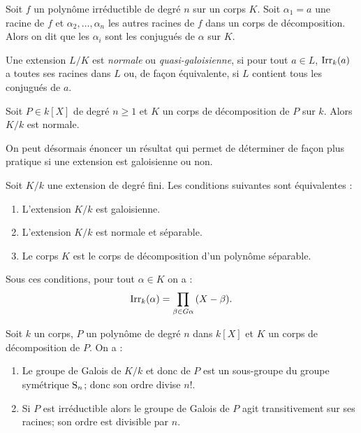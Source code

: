 \documentclass[a4paper]{article} %
\numberwithin{section}{part}
\numberwithin{equation}{section}
\newcommand\Irr[2]{\textup{Irr}_{#1}(#2)}
\begin{document}
Soit $f$ un polynôme irréductible de degré $n$ sur un corps $K$. Soit $\alpha_1 
= a$ une racine de $f$ et $\alpha_2,\dots,\alpha_n$ les autres racines de $f$ 
dans un corps de décomposition. Alors on dit que les $\alpha_i$ sont les 
conjugués de $\alpha$ sur $K$.
\begin{defn}
Une extension $L/K$ est \emph{normale} ou \emph{quasi-galoisienne}, si pour tout
$a\in L$, $\Irr{k}{a}$ a toutes ses racines dans $L$ ou, de façon équivalente,
si $L$ contient tous les conjugués de $a$.
\end{defn}

\begin{prop}
\label{prop:decompnorm}
Soit $P\in k[X]$ de degré $n\geq 1$ et $K$ un corps de décomposition de $P$ sur
$k$. Alors $K/k$ est normale.
\end{prop}

On peut désormais énoncer un résultat qui permet de déterminer de façon plus
pratique si une extension est galoisienne ou non.

\begin{thm}
Soit $K/k$ une extension de degré fini. Les conditions suivantes sont
équivalentes :
\begin{enumerate}
\item L'extension $K/k$ est galoisienne.
\item L'extension $K/k$ est normale et séparable.
\item Le corps $K$ est le corps de décomposition d'un polynôme séparable.
\end{enumerate}
Sous ces conditions, pour tout $\alpha\in K$ on a :
\begin{equation}
\Irr{k}{\alpha} = \prod_{\beta\in G\alpha}{(X - \beta)}.
\end{equation}
\end{thm}

\begin{thm} Soit $k$ un corps, $P$ un polynôme de degré $n$ dans $k[X]$ et $K$ 
un corps de décomposition de $P$. On a :
\begin{enumerate}
\item Le groupe de Galois de $K/k$ et donc de $P$ est un sous-groupe du groupe
symétrique $\textup{S}_n$; donc son ordre divise $n!$.
\item Si $P$ est irréductible alors le groupe de Galois de $P$ agit
transitivement sur ses racines; son ordre est divisible par $n$.
\end{enumerate}
\end{thm}
\end{document}
